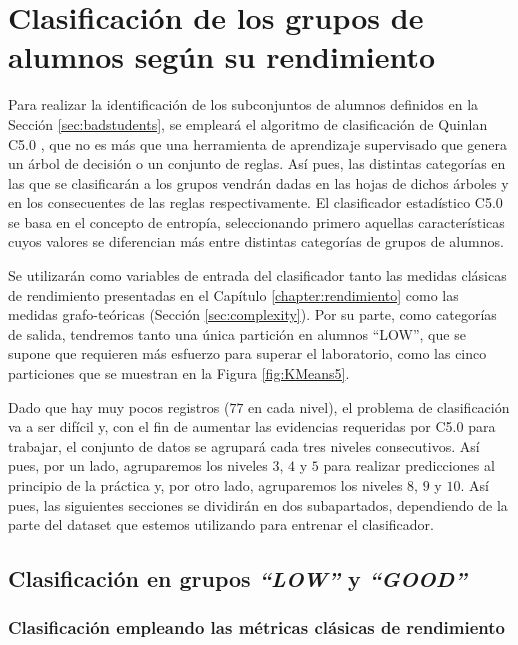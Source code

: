 \chapter{Clasificación de los grupos de alumnos según su rendimiento}\label{sec:chapterXIII}

Para realizar la identificación de los subconjuntos de alumnos definidos en la Sección \ref{sec:badstudents}, se empleará el algoritmo de clasificación de Quinlan C5.0 \cite{Quinlan:See5C5}, que no es más que una herramienta de aprendizaje supervisado que genera un árbol de decisión o un conjunto de reglas. Así pues, las distintas categorías en las que se clasificarán a los grupos vendrán dadas en las hojas de dichos árboles y en los consecuentes de las reglas respectivamente. El clasificador estadístico C5.0 se basa en el concepto de entropía, seleccionando primero aquellas características cuyos valores se diferencian más entre distintas categorías de grupos de alumnos.

Se utilizarán como variables de entrada del clasificador tanto las medidas clásicas de rendimiento presentadas en el Capítulo \ref{chapter:rendimiento} como las medidas grafo-teóricas (Sección \ref{sec:complexity}). Por su parte, como categorías de salida, tendremos tanto una única partición en alumnos ``LOW'', que se supone que requieren más esfuerzo para superar el laboratorio, como las cinco particiones que se muestran en la Figura \ref{fig:KMeans5}.

Dado que hay muy pocos registros ($77$ en cada nivel), el problema de clasificación va a ser difícil y, con el fin de aumentar las evidencias requeridas por C5.0 para trabajar, el conjunto de datos se agrupará cada tres niveles consecutivos. Así pues, por un lado, agruparemos los niveles $3$, $4$ y $5$ para realizar predicciones al principio de la práctica y, por otro lado, agruparemos los niveles $8$, $9$ y $10$. Así pues, las siguientes secciones se dividirán en dos subapartados, dependiendo de la parte del dataset que estemos utilizando para entrenar el clasificador.

\section{Clasificación en grupos \emph{``LOW''} y \emph{``GOOD''}}

\subsection{Clasificación empleando las métricas clásicas de rendimiento}


